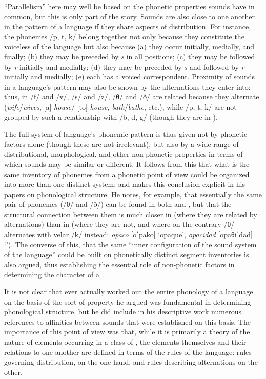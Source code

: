 ``Parallelism'' here may well be based on the phonetic properties sounds
have in common, but this is only part of the story. Sounds are also
close to one another in the pattern of a language if they share
aspects of distribution. For instance, the  phonemes /p, t, k/
belong together not only because they constitute the voiceless 
of the language but also because (a) they occur initially, medially,
and finally; (b) they may be preceded by \emph{s} in all positions;
(c) they may be followed by \emph{r} initially and medially; (d) they
may be preceded by \emph{s} and followed by \emph{r} initially and
medially; (e) each has a voiced correspondent. Proximity of sounds in
a language's pattern may also be shown by the alternations they enter
into: thus, in  /f/ and /v/, /s/ and /z/, /θ/ and /ð/ are
related because they alternate (\emph{wife}/\emph{wives}, [a]
\emph{house}/ [to] \emph{house}, \emph{bath}/\emph{bathe}, etc.),
while /p, t, k/ are not grouped by such a relationship with /b, d, g/
(though they are in ).

The full system of language's phonemic pattern is thus given not by
phonetic factors alone (though these are not irrelevant), but also by
a wide range of distributional, morphological, and other non-phonetic
properties in terms of which sounds may be similar or different. It
follows from this that what is the same inventory of phonemes from a
phonetic point of view could be organized into more than one distinct
system; and {\Sapir} makes this conclusion explicit in his papers on
phonological structure. He notes, for example, that essentially the
same pair of phonemes (/θ/ and /ð/) can be found in both  and
, but that the structural connection between them is much
closer in  (where they are related by alternations) than in
 (where they are not, and where on the contrary /θ/ alternates
with velar /k/ instead: \emph{opaco} {[oˈpako]} `opaque',
\emph{opacidad} {[opaθiˈdad]} `'). The converse of this, that
the same ``inner configuration of the sound system of the language''
could be built on phonetically distinct segment inventories is also
argued, thus establishing the essential role of non-phonetic factors
in determining the character of a .

It is not clear that {\Sapir} ever actually worked out the entire
phonology of a language on the basis of the sort of property he argued
was fundamental in determining phonological structure, but he did
include in his descriptive work numerous references to affinities
between sounds that were established on this basis. The importance of
this point of view was that, while it is primarily a theory of the
nature of elements occurring in a class of , the
elements themselves and their relations to one another are defined in
terms of the rules of the language: rules governing distribution, on
the one hand, and rules describing alternations on the other.

